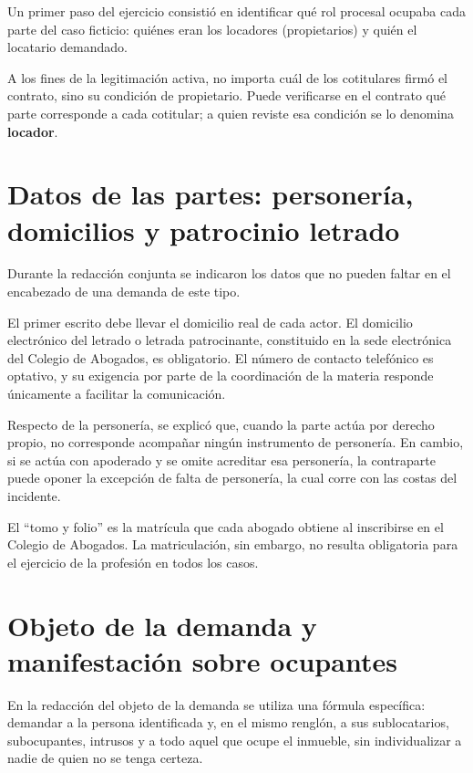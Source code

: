 \documentclass[12pt,oneside]{book}
\begin{document}
Un primer paso del ejercicio consistió en identificar qué rol procesal ocupaba cada parte del caso ficticio: quiénes eran los locadores (propietarios) y quién el locatario demandado.

\begin{note}
A los fines de la legitimación activa, no importa cuál de los cotitulares firmó el contrato, sino su condición de propietario. Puede verificarse en el contrato qué parte corresponde a cada cotitular; a quien reviste esa condición se lo denomina \textbf{locador}.
\end{note}

\section{Datos de las partes: personería, domicilios y patrocinio letrado}

Durante la redacción conjunta se indicaron los datos que no pueden faltar en el encabezado de una demanda de este tipo.

\begin{important}
El primer escrito debe llevar el domicilio real de cada actor. El domicilio electrónico del letrado o letrada patrocinante, constituido en la sede electrónica del Colegio de Abogados, es obligatorio. El número de contacto telefónico es optativo, y su exigencia por parte de la coordinación de la materia responde únicamente a facilitar la comunicación.
\end{important}

Respecto de la personería, se explicó que, cuando la parte actúa por derecho propio, no corresponde acompañar ningún instrumento de personería. En cambio, si se actúa con apoderado y se omite acreditar esa personería, la contraparte puede oponer la excepción de falta de personería, la cual corre con las costas del incidente.

\begin{note}
El ``tomo y folio'' es la matrícula que cada abogado obtiene al inscribirse en el Colegio de Abogados. La matriculación, sin embargo, no resulta obligatoria para el ejercicio de la profesión en todos los casos.
\end{note}

\section{Objeto de la demanda y manifestación sobre ocupantes}

En la redacción del objeto de la demanda se utiliza una fórmula específica: demandar a la persona identificada y, en el mismo renglón, a sus sublocatarios, subocupantes, intrusos y a todo aquel que ocupe el inmueble, sin individualizar a nadie de quien no se tenga certeza.
\end{document}

